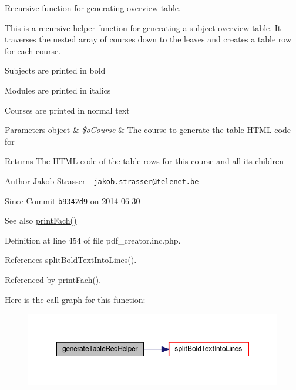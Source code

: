 Recursive function for generating overview table. 

This is a recursive helper function for generating a subject overview table. It traverses the nested array of courses down to the leaves and creates a table row for each course.
\begin{DoxyItemize}
\item Subjects are printed in bold
\item Modules are printed in italics
\item Courses are printed in normal text
\end{DoxyItemize}


\begin{DoxyParams}[1]{Parameters}
object & {\em \$o\+Course} & The course to generate the table H\+T\+M\+L code for \\
\hline
\end{DoxyParams}
\begin{DoxyReturn}{Returns}
The H\+T\+M\+L code of the table rows for this course and all its children
\end{DoxyReturn}
\begin{DoxyAuthor}{Author}
Jakob Strasser -\/ \href{mailto:jakob.strasser@telenet.be}{\tt jakob.\+strasser@telenet.\+be} 
\end{DoxyAuthor}
\begin{DoxySince}{Since}
Commit \href{http://github.com/TheJake123/DrupalModul/commit/b9342d941b3f93e212f3f6af0823a07524dd5954}{\tt b9342d9} on 2014-\/06-\/30
\end{DoxySince}
\begin{DoxySeeAlso}{See also}
\hyperlink{classoverview_p_d_f_abf0674d88080affc25c472fbd0525896}{print\+Fach()} 
\end{DoxySeeAlso}


Definition at line 454 of file pdf\+\_\+creator.\+inc.\+php.



References split\+Bold\+Text\+Into\+Lines().



Referenced by print\+Fach().



Here is the call graph for this function\+:
\nopagebreak
\begin{figure}[H]
\begin{center}
\leavevmode
\includegraphics[width=350pt]{classoverview_p_d_f_ad0ea6c6476d690b08161300e40926dc6_cgraph}
\end{center}
\end{figure}




